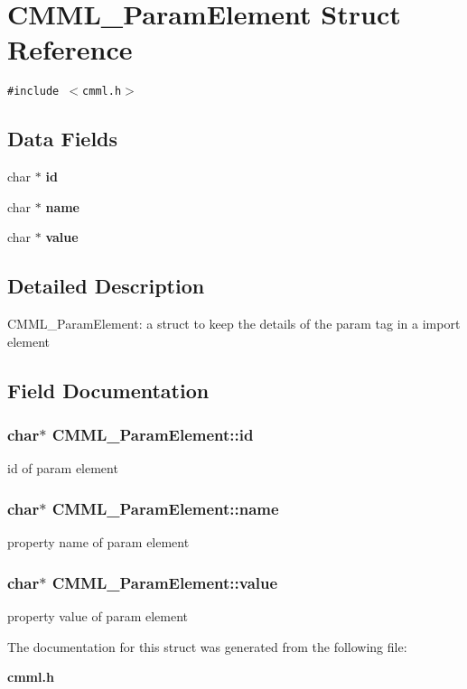 \section{CMML\_\-Param\-Element Struct Reference}
\label{structCMML__ParamElement}
{\tt \#include $<$cmml.h$>$}

\subsection*{Data Fields}
\begin{CompactItemize}
\item 
char $\ast$ {\bf id}
\item 
char $\ast$ {\bf name}
\item 
char $\ast$ {\bf value}
\end{CompactItemize}


\subsection{Detailed Description}
CMML\_\-Param\-Element: a struct to keep the details of the param tag in a import element 



\subsection{Field Documentation}
\subsubsection{\setlength{\rightskip}{0pt plus 5cm}char$\ast$ {\bf CMML\_\-Param\-Element::id}}\label{structCMML__ParamElement_o0}


id of param element 
\subsubsection{\setlength{\rightskip}{0pt plus 5cm}char$\ast$ {\bf CMML\_\-Param\-Element::name}}\label{structCMML__ParamElement_o1}


property name of param element 
\subsubsection{\setlength{\rightskip}{0pt plus 5cm}char$\ast$ {\bf CMML\_\-Param\-Element::value}}\label{structCMML__ParamElement_o2}


property value of param element 

The documentation for this struct was generated from the following file:\begin{CompactItemize}
\item 
{\bf cmml.h}\end{CompactItemize}
